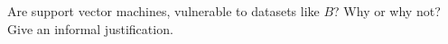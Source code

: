 \item {} Are support vector machines, vulnerable to datasets like $B$? Why or why not? Give an informal
justification.

